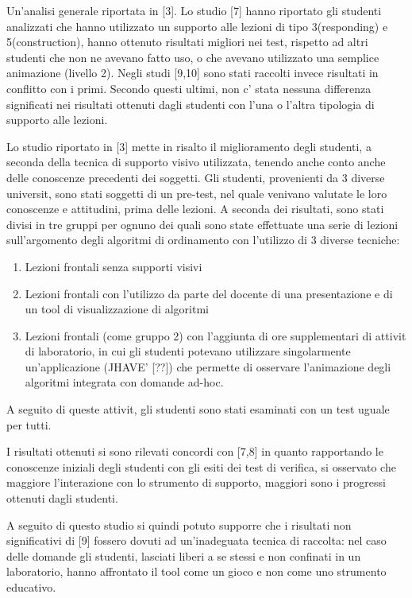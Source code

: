 Un'analisi generale riportata in {[}3{]}. Lo studio {[}7{]} hanno
riportato gli studenti analizzati che hanno utilizzato un supporto
alle lezioni di tipo 3(responding) e 5(construction), hanno ottenuto
risultati migliori nei test, rispetto ad altri studenti che non ne
avevano fatto uso, o che avevano utilizzato una semplice animazione
(livello 2). Negli studi {[}9,10{]} sono stati raccolti invece risultati
in conflitto con i primi. Secondo questi ultimi, non c' stata nessuna
differenza significati nei risultati ottenuti dagli studenti con l'una
o l'altra tipologia di supporto alle lezioni.

Lo studio riportato in {[}3{]} mette in risalto il miglioramento degli
studenti, a seconda della tecnica di supporto visivo utilizzata, tenendo
anche conto anche delle conoscenze precedenti dei soggetti. Gli studenti,
provenienti da 3 diverse universit, sono stati soggetti di un pre-test,
nel quale venivano valutate le loro conoscenze e attitudini, prima
delle lezioni. A seconda dei risultati, sono stati divisi in tre gruppi
per ognuno dei quali sono state effettuate una serie di lezioni sull'argomento
degli algoritmi di ordinamento con l'utilizzo di 3 diverse tecniche: 
\begin{enumerate}
\item Lezioni frontali senza supporti visivi 
\item Lezioni frontali con l'utilizzo da parte del docente di una presentazione
e di un tool di visualizzazione di algoritmi 
\item Lezioni frontali (come gruppo 2) con l'aggiunta di ore supplementari
di attivit di laboratorio, in cui gli studenti potevano utilizzare
singolarmente un'applicazione (JHAVE' {[}??{]}) che permette di osservare
l'animazione degli algoritmi integrata con domande ad-hoc. 
\end{enumerate}
A seguito di queste attivit, gli studenti sono stati esaminati con
un test uguale per tutti.

I risultati ottenuti si sono rilevati concordi con {[}7,8{]} in quanto
rapportando le conoscenze iniziali degli studenti con gli esiti dei
test di verifica, si osservato che maggiore l'interazione con lo strumento
di supporto, maggiori sono i progressi ottenuti dagli studenti.

A seguito di questo studio si quindi potuto supporre che i risultati
non significativi di {[}9{]} fossero dovuti ad un'inadeguata tecnica
di raccolta: nel caso delle domande gli studenti, lasciati liberi
a se stessi e non confinati in un laboratorio, hanno affrontato il
tool come un gioco e non come uno strumento educativo.

